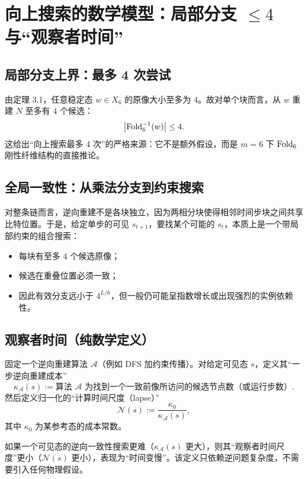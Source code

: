 
\section{向上搜索的数学模型：局部分支 $\le 4$ 与“观察者时间”}

\subsection{局部分支上界：最多 4 次尝试}

由定理 3.1，任意稳定态 $w\in X_6$ 的原像大小至多为 $4$。故对单个块而言，从 $w$ 重建 $N$ 至多有 $4$ 个候选：
$$
\bigl|\mathrm{Fold}_6^{-1}(w)\bigr|\le 4.
$$
这给出“向上搜索最多 4 次”的严格来源：它不是额外假设，而是 $m=6$ 下 $\mathrm{Fold}_6$ 刚性纤维结构的直接推论。

\subsection{全局一致性：从乘法分支到约束搜索}

对整条链而言，逆向重建不是各块独立，因为两相分块使得相邻时间步块之间共享比特位置。于是，给定单步的可见 $s_{t+1}$，要找某个可能的 $s_t$，本质上是一个带局部约束的组合搜索：
\begin{itemize}
  \item 每块有至多 $4$ 个候选原像；
  \item 候选在重叠位置必须一致；
  \item 因此有效分支远小于 $4^{L/6}$，但一般仍可能呈指数增长或出现强烈的实例依赖性。
\end{itemize}

\subsection{观察者时间（纯数学定义）}

固定一个逆向重建算法 $\mathcal{A}$（例如 DFS 加约束传播）。对给定可见态 $s$，定义其“一步逆向重建成本”
$$
\kappa_{\mathcal{A}}(s):=\text{算法 }\mathcal{A}\text{ 为找到一个一致前像所访问的候选节点数（或运行步数）}.
$$
然后定义归一化的“计算时间尺度（lapse）”
$$
\mathcal{N}(s):=\frac{\kappa_0}{\kappa_{\mathcal{A}}(s)},
$$
其中 $\kappa_0$ 为某参考态的成本常数。

\begin{remark}[数学版结论]
如果一个可见态的逆向一致性搜索更难（$\kappa_{\mathcal{A}}(s)$ 更大），则其“观察者时间尺度”更小（$\mathcal{N}(s)$ 更小），表现为“时间变慢”。该定义只依赖逆问题复杂度，不需要引入任何物理假设。
\end{remark}

